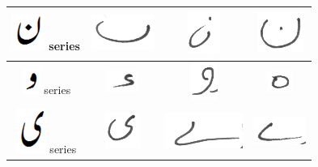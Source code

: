 \begin{table}[h]
\begin{tabular}{@{}cccc@{}}
\hline
\includegraphics[scale=0.15]{noon_orig} series & \includegraphics[scale=0.15]{noon_guna} & \includegraphics[scale=0.15]{noon} & 
\includegraphics[scale=0.15]{noon2} \\
\hline
\includegraphics[scale=0.15]{wao_orig} series & \includegraphics[scale=0.15]{capture} & \includegraphics[scale=0.15]{wao}  & 
\includegraphics[scale=0.15]{haaa} \\
\hline
\includegraphics[scale=0.15]{choti_ye_orig} series & \includegraphics[scale=0.15]{choti_yaa2} & \includegraphics[scale=0.15]{Bari_yaa2} & 
\includegraphics[scale=0.15]{bari_yaa} \\

 \end{tabular}
\end{table}


